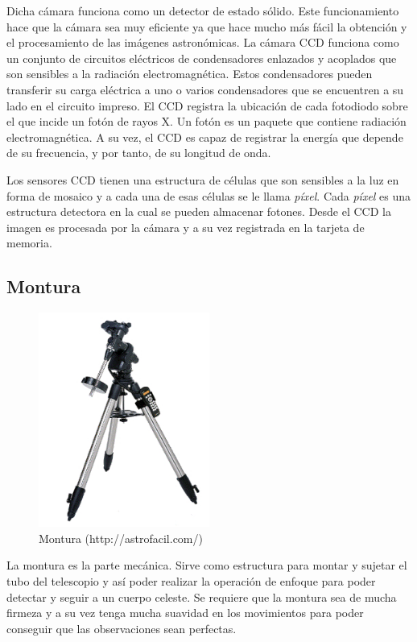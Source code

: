 Dicha cámara funciona como un detector de estado sólido. Este funcionamiento hace que la cámara sea muy eficiente ya que hace mucho más fácil la obtención y el procesamiento de las imágenes astronómicas.
La cámara CCD funciona como un conjunto de circuitos eléctricos  de condensadores enlazados y acoplados que son sensibles a la radiación electromagnética. Estos condensadores pueden transferir su carga eléctrica a uno o varios condensadores que se encuentren a su lado en el circuito impreso. El CCD registra la ubicación de cada fotodiodo sobre el que incide un fotón de rayos X. Un fotón es un paquete que contiene radiación electromagnética. A su vez, el CCD es capaz de registrar la energía que depende de su frecuencia, y por tanto, de su longitud de onda.

Los sensores CCD tienen una estructura de células que son sensibles a la luz en forma de mosaico y a cada una de esas células se le llama \textit{píxel}. Cada \textit{píxel} es una estructura detectora en la cual se pueden almacenar fotones. Desde el CCD la imagen es procesada por la cámara y a su vez registrada en la tarjeta de memoria.


\subsection{Montura}
\begin{figure}[htb]
\centering
\includegraphics[width=0.5\textwidth]{./imagenes/montura}
\caption{Montura (http://astrofacil.com/)} \label{fig:montura}
\end{figure}
La montura es la parte mecánica. Sirve como estructura para montar y sujetar el tubo del telescopio y así poder realizar la operación de enfoque para poder detectar y seguir a un cuerpo celeste. Se requiere que la montura sea de mucha firmeza y a su vez tenga mucha suavidad en los movimientos para poder conseguir que las observaciones sean perfectas.

